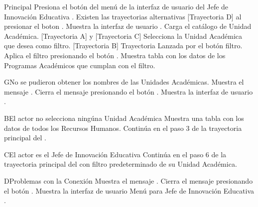 \begin{UCtrayectoria}{Principal}
    \UCpaso[\UCactor] Presiona el botón  del menú de la interfaz de usuario del Jefe de Innovación Educativa  . Existen las trayectorias alternativas [Trayectoria D] al presionar el boton  .
    \UCpaso Muestra la interfaz de usuario .
    \UCpaso Carga el catálogo de Unidad Académica. [Trayectoria A] y [Trayectoria C]
    \UCpaso[\UCactor] Selecciona la Unidad Académica que desea como filtro. [Trayectoria B] Trayectoria Lanzada por el botón filtro.
    \UCpaso[\UCactor] Aplica el filtro presionando el botón .
    \UCpaso Muestra tabla con los datos de los Programas Académicos que cumplan con el filtro.
\end{UCtrayectoria}

\begin{UCtrayectoriaA}{G}{No se pudieron obtener los nombres de las Unidades Académicas.}
    \UCpaso Muestra el mensaje .
    \UCpaso[\UCactor] Cierra el mensaje presionando el botón .
    \UCpaso Muestra la interfaz de usuario .
\end{UCtrayectoriaA}

\begin{UCtrayectoriaA}{B}{El actor no selecciona ningúna Unidad Académica}
    \UCpaso Muestra una tabla con los datos de todos los Recursos Humanos.
    \UCpaso Continúa en el paso 3 de la trayectoria principal del .
\end{UCtrayectoriaA}

\begin{UCtrayectoriaA}{C}{El actor es el Jefe de Innovación Educativa}
    \UCpaso Continúa en el paso 6 de la trayectoria principal del  con filtro predeterminado de su Unidad Académica.
\end{UCtrayectoriaA}

\begin{UCtrayectoriaA}{D}{Problemas con la Conexión}
    \UCpaso Muestra el mensaje .
    \UCpaso[\UCactor] Cierra el mensaje presionando el botón .
    \UCpaso Muestra la interfaz de usuario Menú para Jefe de Innovación Educativa .
\end{UCtrayectoriaA}
